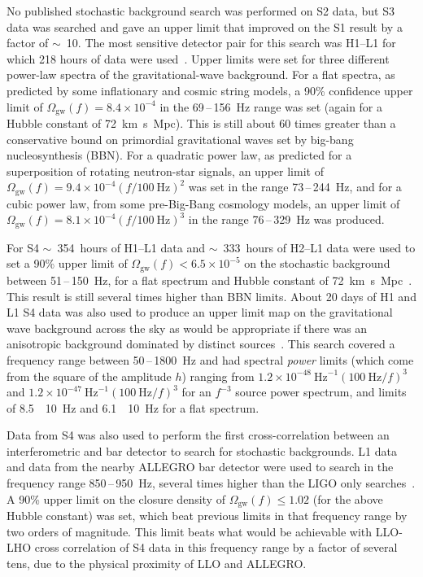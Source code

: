 \documentclass{article}
\begin{document}
No published stochastic background search was performed on S2 data, but S3 data
was searched and gave an upper limit that improved on the S1 result by a factor
of $\sim$~10. The most sensitive detector pair for this search was H1--L1 for
which 218 hours of data were used~\cite{Abbott:2005h}. Upper limits were set for
three different power-law spectra of the gravitational-wave background. For a
flat spectra, as predicted by some inflationary and cosmic string models, a 90\%
confidence upper limit of $\Omega_{\mathrm{gw}}(f) = 8.4\times10^{-4}$ in the
69\,--\,156~Hz range was set (again for a Hubble constant of
72~km~s~Mpc). This is still about 60 times greater than a
conservative bound on primordial gravitational waves set by big-bang
nucleosynthesis (BBN). For a quadratic power law, as predicted for a
superposition of rotating neutron-star signals, an upper limit of
$\Omega_{\mathrm{gw}}(f) = 9.4\times10^{-4}(f/100 \mathrm{\ Hz})^2$ was set in the range 73\,--\,244~Hz,
and for a cubic power law, from some pre-Big-Bang cosmology models, an upper
limit of $\Omega_{\mathrm{gw}}(f) = 8.1\times10^{-4}(f/100 \mathrm{\ Hz})^3$ in the range
76\,--\,329~Hz was produced.

For S4 $\sim$~354~hours of H1--L1 data and $\sim$~333~hours of H2--L1 data were
used to set a 90\% upper limit of $\Omega_{\mathrm{gw}}(f) < 6.5\times10^{-5}$ on
the stochastic background between 51\,--\,150~Hz, for a flat spectrum and Hubble
constant of 72~km~s~Mpc~\cite{Abbott:2007e}. This result is
still several times higher than BBN limits. About 20 days of H1 and L1 S4 data
was also used to produce an upper limit map on the gravitational wave background
across the sky as would be appropriate if there was an anisotropic background
dominated by distinct sources~\cite{Abbott:2007f}. This search covered a
frequency range between 50\,--\,1800~Hz and had spectral \textit{power} limits (which
come from the square of the amplitude $h$) ranging from
$1.2\times10^{-48} \mathrm{\ Hz}^{-1} (100 \mathrm{\ Hz}/f)^3$ and
$1.2\times10^{-47} \mathrm{\ Hz}^{-1} (100 \mathrm{\ Hz}/f)^3$ for an
$f^{-3}$ source power spectrum, and limits of
8.5~\texttimes~10~Hz and
6.1~\texttimes~10~Hz for a flat spectrum.

Data from S4 was also used to perform the first cross-correlation between an
interferometric and bar detector to search for stochastic backgrounds. L1 data
and data from the nearby ALLEGRO bar detector were used to search in the
frequency range 850\,--\,950~Hz, several times higher than the LIGO only
searches~\cite{Abbott:2007g}. A 90\% upper limit on the closure
density of $\Omega_{\mathrm{gw}}(f) \leq 1.02$ (for the above Hubble
constant) was set, which beat previous limits in that frequency range
by two orders of magnitude. This limit beats what would be achievable
with LLO-LHO cross correlation of S4 data in this frequency range by a
factor of several tens, due to the physical proximity of LLO and ALLEGRO.
\end{document}
